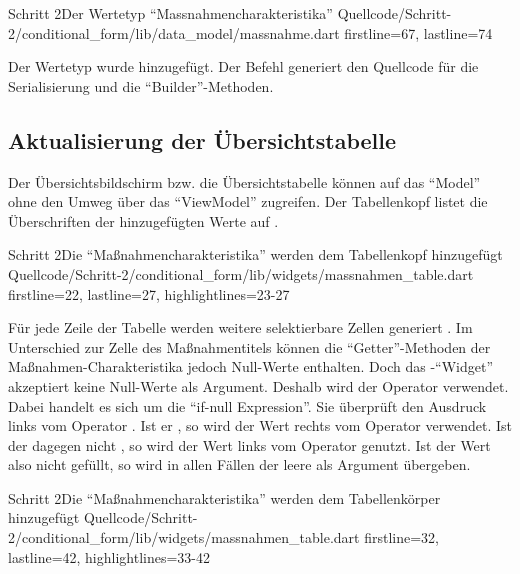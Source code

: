 \begin{alexlisting}{Schritt 2}{Der Wertetyp \enquote{Massnahmencharakteristika}}
  {Quellcode/Schritt-2/conditional_form/lib/data_model/massnahme.dart}
  {firstline=67, lastline=74}
  \label{lst:Schritt2WerteTypMassnahmencharakteristika}
\end{alexlisting}

Der Wertetyp wurde hinzugefügt.
Der Befehl  generiert den Quellcode für die Serialisierung und die \enquote{Builder}-Methoden.

\subsection{Aktualisierung der Übersichtstabelle}

Der Übersichtsbildschirm bzw. die Übersichtstabelle können auf das \enquote{Model} ohne den Umweg über das \enquote{ViewModel} zugreifen.
Der Tabellenkopf listet die Überschriften der hinzugefügten Werte auf .

\begin{alexlisting}{Schritt 2}{Die \enquote{Maßnahmencharakteristika} werden dem Tabellenkopf hinzugefügt}
  {Quellcode/Schritt-2/conditional_form/lib/widgets/massnahmen_table.dart}
  {firstline=22, lastline=27, highlightlines={23-27}}
  \label{lst:Schritt2MassnahmencharakteristikaEerdenDemTabellenkopfHinzugefuegt}
\end{alexlisting}

Für jede Zeile der Tabelle werden weitere selektierbare Zellen generiert .
Im Unterschied zur Zelle des Maßnahmentitels können die \enquote{Getter}-Methoden der Maßnahmen-Charakteristika jedoch Null-Werte enthalten.
Doch das -\enquote{Widget} akzeptiert keine Null-Werte als Argument.
Deshalb wird der Operator  verwendet. Dabei handelt es sich um die \enquote{if-null Expression}. 
Sie überprüft den Ausdruck links vom Operator . Ist er , so wird der Wert rechts vom Operator verwendet.
Ist der dagegen nicht , so wird der Wert links vom Operator  genutzt.
 Ist der Wert also nicht gefüllt, so wird in allen Fällen der leere   als Argument übergeben.

\begin{alexlisting}{Schritt 2}{Die \enquote{Maßnahmencharakteristika} werden dem Tabellenkörper hinzugefügt}
  {Quellcode/Schritt-2/conditional_form/lib/widgets/massnahmen_table.dart}
  {firstline=32, lastline=42, highlightlines={33-42}}
  \label{lst:Schritt2MassnahmencharakteristikaWerdenDemTabellenkoerperHinzugefuegt}
\end{alexlisting}

